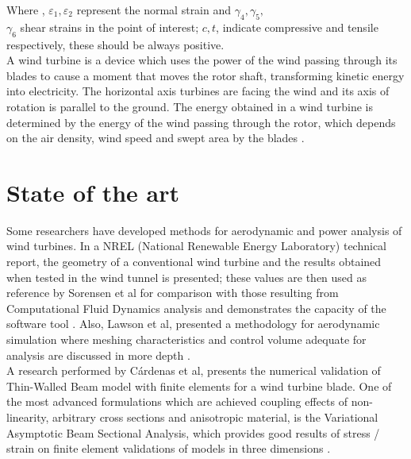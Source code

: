 Where , $\varepsilon_1, \varepsilon_2$ represent the normal strain and $\gamma_4, \gamma_5,$\\ $\gamma_6$ shear strains in the point of interest; $c, t$, indicate compressive and tensile respectively,  these should be always positive.\\

A wind turbine is a device which uses the power of the wind passing through its blades to cause a moment that moves the rotor shaft, transforming kinetic energy into electricity. The horizontal axis turbines are facing the wind and its axis of rotation is parallel to the ground. The energy obtained in a wind turbine is determined by the energy of the wind passing through the rotor, which depends on the air density, wind speed and swept area by the blades \cite{calvo}.


\vspace{-0.5cm}
\section{State of the art}
\label{sec:2}
Some researchers have developed methods for aerodynamic and power analysis of wind turbines. In a NREL (National Renewable Energy Laboratory) technical report, the geometry of a conventional wind turbine and the results obtained when tested in the wind tunnel \cite{nrel} is presented; these values are then used as reference by Sorensen et al for comparison with those resulting from Computational Fluid Dynamics analysis and demonstrates the capacity of the software tool \cite{sor}. Also, Lawson et al, presented a methodology for aerodynamic simulation where meshing characteristics and control volume adequate for analysis are discussed in more depth \cite{lawson}.\\

A research performed by C{\'a}rdenas et al, presents the numerical validation of Thin-Walled Beam model with finite elements for a wind turbine blade. One of the most advanced formulations which are achieved coupling effects of non-linearity, arbitrary cross sections and anisotropic material, is the Variational Asymptotic Beam Sectional Analysis, which provides good results of stress / strain on finite element validations of models in three dimensions \cite{cardenas}.\\

